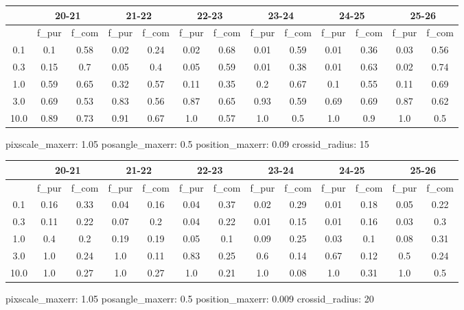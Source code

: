 \documentclass{article}
\begin{document}
\begin{figure}[H]
\centering
\begin{tabular}{|c|c|c|c|c|c|c|c|c|c|c|c|c|}
\hline
\multicolumn{1}{|c|}{} & \multicolumn{2}{|c|}{20-21} & \multicolumn{2}{|c|}{21-22} & \multicolumn{2}{|c|}{22-23} & \multicolumn{2}{|c|}{23-24} & \multicolumn{2}{|c|}{24-25} & \multicolumn{2}{|c|}{25-26}\\
\hline \hline
 & f\_pur & f\_com & f\_pur & f\_com & f\_pur & f\_com & f\_pur & f\_com & f\_pur & f\_com & f\_pur & f\_com \\
\hline
0.1 & 0.1 & 0.58 & 0.02 & 0.24 & 0.02 & 0.68 & 0.01 & 0.59 & 0.01 & 0.36 & 0.03 & 0.56\\
\hline
0.3 & 0.15 & 0.7 & 0.05 & 0.4 & 0.05 & 0.59 & 0.01 & 0.38 & 0.01 & 0.63 & 0.02 & 0.74\\
\hline
1.0 & 0.59 & 0.65 & 0.32 & 0.57 & 0.11 & 0.35 & 0.2 & 0.67 & 0.1 & 0.55 & 0.11 & 0.69\\
\hline
3.0 & 0.69 & 0.53 & 0.83 & 0.56 & 0.87 & 0.65 & 0.93 & 0.59 & 0.69 & 0.69 & 0.87 & 0.62\\
\hline
10.0 & 0.89 & 0.73 & 0.91 & 0.67 & 1.0 & 0.57 & 1.0 & 0.5 & 1.0 & 0.9 & 1.0 & 0.5\\
\hline
\end{tabular}
\caption{pixscale\_maxerr: 1.05 posangle\_maxerr: 0.5 position\_maxerr: 0.09 crossid\_radius: 15}
\end{figure}

\begin{figure}[H]
\centering
\begin{tabular}{|c|c|c|c|c|c|c|c|c|c|c|c|c|}
\hline
\multicolumn{1}{|c|}{} & \multicolumn{2}{|c|}{20-21} & \multicolumn{2}{|c|}{21-22} & \multicolumn{2}{|c|}{22-23} & \multicolumn{2}{|c|}{23-24} & \multicolumn{2}{|c|}{24-25} & \multicolumn{2}{|c|}{25-26}\\
\hline \hline
 & f\_pur & f\_com & f\_pur & f\_com & f\_pur & f\_com & f\_pur & f\_com & f\_pur & f\_com & f\_pur & f\_com \\
\hline
0.1 & 0.16 & 0.33 & 0.04 & 0.16 & 0.04 & 0.37 & 0.02 & 0.29 & 0.01 & 0.18 & 0.05 & 0.22\\
\hline
0.3 & 0.11 & 0.22 & 0.07 & 0.2 & 0.04 & 0.22 & 0.01 & 0.15 & 0.01 & 0.16 & 0.03 & 0.3\\
\hline
1.0 & 0.4 & 0.2 & 0.19 & 0.19 & 0.05 & 0.1 & 0.09 & 0.25 & 0.03 & 0.1 & 0.08 & 0.31\\
\hline
3.0 & 1.0 & 0.24 & 1.0 & 0.11 & 0.83 & 0.25 & 0.6 & 0.14 & 0.67 & 0.12 & 0.5 & 0.24\\
\hline
10.0 & 1.0 & 0.27 & 1.0 & 0.27 & 1.0 & 0.21 & 1.0 & 0.08 & 1.0 & 0.31 & 1.0 & 0.5\\
\hline
\end{tabular}
\caption{pixscale\_maxerr: 1.05 posangle\_maxerr: 0.5 position\_maxerr: 0.009 crossid\_radius: 20}
\end{figure}
\end{document}

